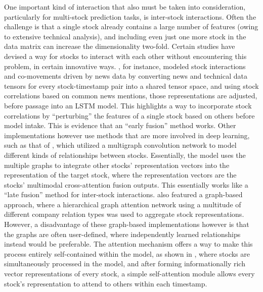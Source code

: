 \documentclass[stu,floatsintext]{apa7}
\begin{document}
One important kind of interaction that also must be taken into consideration, particularly for multi-stock prediction tasks, is inter-stock interactions. Often the challenge is that a single stock already contains a large number of features (owing to extensive technical analysis), and including even just one more stock in the data matrix can increase the dimensionality two-fold. Certain studies have devised a way for stocks to interact with each other without encountering this problem, in certain innovative ways. \textcite{li2020multimodal}, for instance, modeled stock interactions and co-movements driven by news data by converting news and technical data tensors for every stock-timestamp pair into a shared tensor space, and using stock correlations based on common news mentions, those representations are adjusted, before passage into an LSTM model. This highlights a way to incorporate stock correlations by ``perturbing'' the features of a single stock based on others before model intake. This is evidence that an ``early fusion'' method works. Other implementations however use methods that are more involved in deep learning, such as that of \textcite{mandal2023enhancing}, which utilized a multigraph convolution network to model different kinds of relationships between stocks. Essentially, the model uses the multiple graphs to integrate other stocks' representation vectors into the representation of the target stock, where the representation vectors are the stocks' multimodal cross-attention fusion outputs. This essentially works like a ``late fusion'' method for inter-stock interactions. \textcite{kim2019hats} also featured a graph-based approach, where a hierarchical graph attention network using a multitude of different company relation types was used to aggregate stock representations. However, a disadvantage of these graph-based implementations however is that the graphs are often user-defined, where independently learned relationships instead would be preferable. The attention mechanism offers a way to make this process entirely self-contained within the model, as shown in \textcite{xu2025hrformer}, where stocks are simultaneously processed in the model, and after forming informationally rich vector representations of every stock, a simple self-attention module allows every stock's representation to attend to others within each timestamp.
\end{document}
